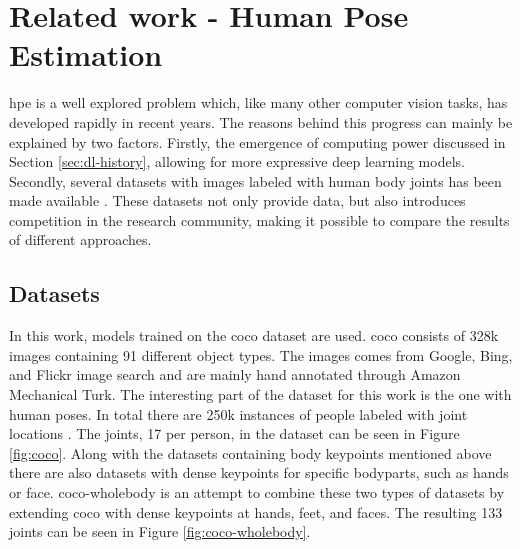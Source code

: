 \chapter{Related work - Human Pose Estimation} \label{sec:pose_estimation} \label{ch:hpe}
\gls{hpe} is a well explored problem which, like many other computer vision tasks, has developed rapidly in recent years. The reasons behind this progress can mainly be explained by two factors. Firstly, the emergence of computing power discussed in Section \ref{sec:dl-history}, allowing for more expressive deep learning models. Secondly, several datasets with images labeled with human body joints has been made available \cite{Chen2020}. These datasets not only provide data, but also introduces competition in the research community, making it possible to compare the results of different approaches.

\section{Datasets} \label{sec:datasets}

In this work, models trained on the \gls{coco} dataset are used. \gls{coco} consists of 328k images containing 91 different object types. The images comes from Google, Bing, and Flickr image search and are mainly hand annotated through Amazon Mechanical Turk. The interesting part of the dataset for this work is the one with human poses. In total there are 250k instances of people labeled with joint locations \cite{Lin2014}. The joints, 17 per person, in the dataset can be seen in Figure \ref{fig:coco}. Along with the datasets containing body keypoints mentioned above there are also datasets with dense keypoints for specific bodyparts, such as hands or face. \gls{coco}-wholebody \cite{Jin2020} is an attempt to combine these two types of datasets by extending \gls{coco} with dense keypoints at hands, feet, and faces. The resulting 133 joints can be seen in Figure \ref{fig:coco-wholebody}.

